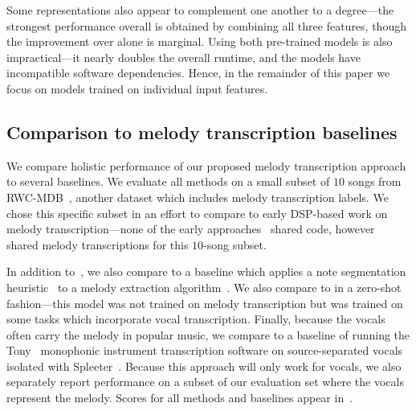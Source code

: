 Some representations also appear to complement one another to a degree---the strongest performance overall is obtained by combining all three features, though the improvement over \jukebox{} alone is marginal. 
Using both pre-trained models is also impractical---it nearly doubles the overall runtime, and the models have incompatible software dependencies. 
Hence, in the remainder of this paper we focus on models trained on individual input features.

\subsection{Comparison to melody transcription baselines}

We compare holistic performance of our proposed melody transcription approach to several baselines. 
We evaluate all methods on a small subset of $10$ songs from RWC-MDB~\cite{goto2002rwc,goto2003rwc,goto2004development}, 
another dataset which includes melody transcription labels. 
We chose this specific subset in an effort to compare to early DSP-based work on melody transcription---none of the early approaches~\cite{paiva2004auditory,paiva2005detection,ryynanen2008automatic,weil2009automatic} shared code, however~\cite{ryynanen2008automatic} shared melody transcriptions for this $10$-song subset.

In addition to~\cite{ryynanen2008accompaniment}, we also compare to a baseline which applies a note segmentation heuristic~\cite{salamon2015midi} to a melody extraction algorithm~\cite{salamon2014melody}. 
We also compare to \mtthree{} in a zero-shot fashion---this model was not trained on melody transcription but was trained on some tasks which incorporate vocal transcription. 
Finally, because the vocals often carry the melody in popular music, we compare to a baseline of running the Tony~\cite{mauch2015computer} monophonic instrument transcription software on source-separated vocals isolated with Spleeter~\cite{hennequin2020spleeter}. 
Because this approach will only work for vocals, we also separately report performance on a subset of our evaluation set where the vocals represent the melody. 
Scores for all methods and baselines appear in~. 

